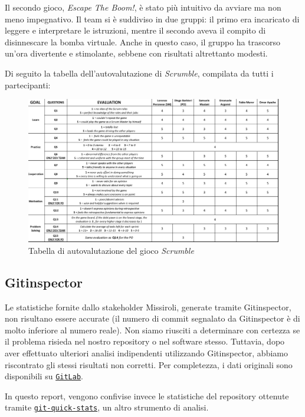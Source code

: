\documentclass{article}
\begin{document}
Il secondo gioco, \textit{Escape The Boom!}, è stato più intuitivo da avviare ma non meno impegnativo. Il team si è suddiviso in due gruppi: 
il primo era incaricato di leggere e interpretare le istruzioni, mentre il secondo aveva il compito di disinnescare la bomba virtuale. Anche 
in questo caso, il gruppo ha trascorso un'ora divertente e stimolante, sebbene con risultati altrettanto modesti.

Di seguito la tabella dell'autovalutazione di \textit{Scrumble}, compilata da tutti i partecipanti:

\begin{figure}[H]
    \centering
    \includegraphics[width=1\textwidth]{report-scrumble}
    \caption{Tabella di autovalutazione del gioco \textit{Scrumble}}
    \label{fig:scrumble}
\end{figure}


\subsection{Gitinspector}

Le statistiche fornite dallo stakeholder Missiroli, generate tramite Gitinspector, non risultano essere accurate (il numero di commit 
segnalato da Gitinspector è di molto inferiore al numero reale). Non siamo riusciti a determinare con certezza se il problema risieda nel nostro 
repository o nel software stesso. Tuttavia, dopo aver effettuato ulteriori analisi indipendenti utilizzando Gitinspector, abbiamo riscontrato 
gli stessi risultati non corretti. Per completezza, i dati originali sono disponibili su 
\href{https://gitlab.vezgammon.it/diego/vezgammon/-/tree/main/doc/feedback_stakeholders}{\texttt{GitLab}}.

In questo report, vengono confivise invece le statistiche del repository ottenute tramite 
\href{https://github.com/git-quick-stats/git-quick-stats}{\texttt{git-quick-stats}}, un altro strumento di analisi. 
\end{document}
